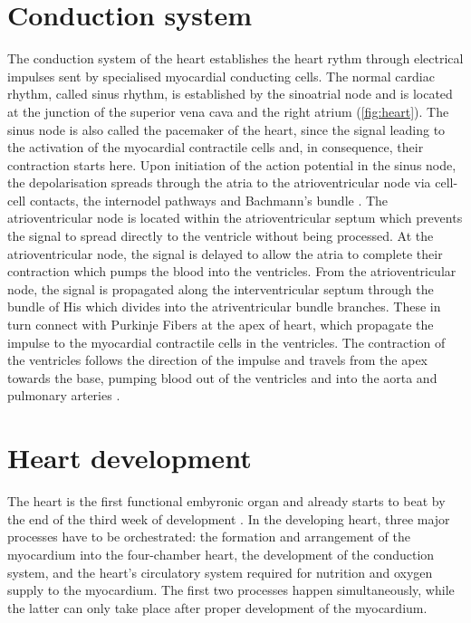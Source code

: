 \section{Conduction system}
The conduction system of the heart establishes the heart rythm through electrical impulses sent by specialised myocardial conducting cells. The normal cardiac rhythm, called sinus rhythm, is established by the sinoatrial node and is located at the junction of the superior vena cava and the right atrium (\cref{fig:heart}). The sinus node is also called the pacemaker of the heart, since the signal leading to the activation of the myocardial contractile cells and, in consequence, their contraction starts here. Upon initiation of the action potential in the sinus node, the depolarisation spreads through the atria to the atrioventricular node via cell-cell contacts, the internodel pathways and Bachmann's bundle \citep{Laske2005,Anderson2009}. The atrioventricular node is located within the atrioventricular septum which prevents the signal to spread directly to the ventricle without being processed. At the atrioventricular node, the signal is delayed to allow the atria to complete their contraction which pumps the blood into the ventricles. From the atrioventricular node, the signal is propagated along the interventricular septum through the bundle of His which divides into the atriventricular bundle branches. These in turn connect with Purkinje Fibers at the apex of heart, which propagate the impulse to the myocardial contractile cells in the ventricles. The contraction of the ventricles follows the direction of the impulse and travels from the apex towards the base, pumping blood out of the ventricles and into the aorta and pulmonary arteries \citep{Laske2005,Sigg2010}.  

\section{Heart development}
\label{section:heart-development}
The heart is the first functional embyronic organ and already starts to beat by the end of the third week of development \citep{Zambrano2002}. In the developing heart, three major processes have to be orchestrated: the formation and arrangement of the myocardium into the four-chamber heart, the development of the conduction system, and the heart's circulatory system required for nutrition and oxygen supply to the myocardium. The first two processes happen simultaneously, while the latter can only take place after proper development of the myocardium. 

